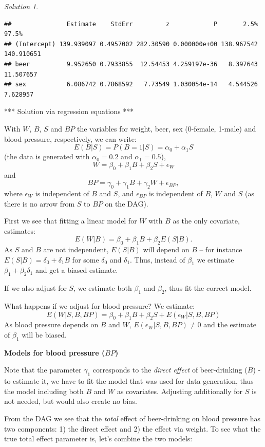 \documentclass[
]{book}
\theoremstyle{definition}
\theoremstyle{definition}
\theoremstyle{definition}
\theoremstyle{definition}
\theoremstyle{remark}
\newtheorem*{solution}{Solution}
\begin{document}
\begin{solution}
\begin{verbatim}
##               Estimate    StdErr         z            P       2.5%      97.5%
## (Intercept) 139.939097 0.4957002 282.30590 0.000000e+00 138.967542 140.910651
## beer          9.952650 0.7933855  12.54453 4.259197e-36   8.397643  11.507657
## sex           6.086742 0.7868592   7.73549 1.030054e-14   4.544526   7.628957
\end{verbatim}

*** Solution via regression equations ***

With \(W\), \(B\), \(S\) and \(BP\) the variables for weight, beer, sex (0-female, 1-male) and blood pressure, respectively, we can write:
\[E(B|S) = P(B=1|S) = \alpha_0 + \alpha_1 S  \]
(the data is generated with \(\alpha_0=0.2\) and \(\alpha_1=0.5\)),
\[W = \beta_0 + \beta_1 B + \beta_2S + \epsilon_W\]
and
\[BP = \gamma_0 + \gamma_1 B + \gamma_2W + \epsilon_{BP},\]
where \(\epsilon_W\) is independent of \(B\) and \(S\), and \(\epsilon_{BP}\) is independent of \(B\), \(W\) and \(S\) (as there is no arrow from \(S\) to \(BP\) on the DAG).

First we see that fitting a linear model for \(W\) with \(B\) as the only covariate, estimates: \[E(W|B)= \beta_0 + \beta_1 B + \beta_2E(S|B).\] As \(S\) and \(B\) are not independent, \(E(S|B)\) will depend on \(B\) -- for instance \(E(S|B)=\delta_0 + \delta_1B\) for some \(\delta_0\) and \(\delta_1\). Thus, instead of \(\beta_1\) we estimate \(\beta_1+ \beta_2\delta_1\) and get a biased estimate.

If we also adjust for \(S\), we estimate both \(\beta_1\) and \(\beta_2\), thus fit the correct model.

What happens if we adjust for blood pressure? We estimate:
\[E(W|S,B,BP) = \beta_0 + \beta_1 B + \beta_2S + E(\epsilon_W|S,B,BP)\]
As blood pressure depends on \(B\) and \(W\), \(E(\epsilon_W|S,B,BP) \ne 0\) and the estimate of \(\beta_1\) will be biased.

\textbf{Models for blood pressure (\(BP\))}

Note that the parameter \(\gamma_1\) corresponds to the \emph{direct effect} of beer-drinking (\(B\)) - to estimate it, we have to fit the model that was used for data generation, thus the model including both \(B\) and \(W\) as covariates. Adjusting additionally for \(S\) is not needed, but would also create no bias.

From the DAG we see that the \emph{total} effect of beer-drinking on blood pressure has two components: 1) the direct effect and 2) the effect via weight. To see what the true total effect parameter is, let's combine the two models:


\end{solution}
\end{document}
